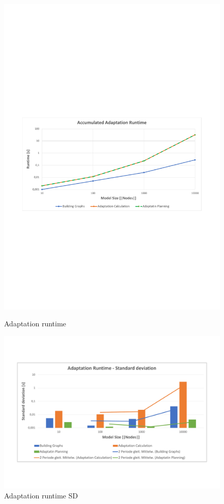 \begin{figure}[h]
	\centering
	\begin{minipage}[b]{0.49\textwidth}		
		\includegraphics[trim = 15mm 90mm 15mm 100mm, clip, width=1.00\textwidth]{graphs/Runtime_adapt}
		\caption{Adaptation runtime}
		\label{fig:eval:adap:runtime}
	\end{minipage}
	\begin{minipage}[b]{0.49\textwidth}
		\includegraphics[trim = 10mm 26mm 10mm 11mm, clip, width=1.00\textwidth]{graphs/Runtime_adapt_sd}
		\caption{Adaptation runtime SD}
		\label{fig:eval:adap:runtime_sd}
	\end{minipage}
\end{figure}


